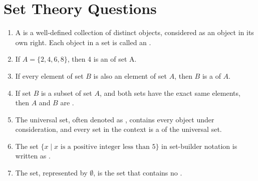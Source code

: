 \documentclass{article}
\begin{document}
\section*{Set Theory Questions}

\begin{enumerate}
    \item A \underline{\hspace{1cm}} is a well-defined collection of distinct objects, considered as an object in its own right. Each object in a set is called an \underline{\hspace{1cm}}.\\[1em]

    \item If \( A = \{ 2, 4, 6, 8 \} \), then 4 is an \underline{\hspace{1cm}} of set A.\\[1em]

    \item If every element of set \( B \) is also an element of set \( A \), then \( B \) is a \underline{\hspace{1cm}} of \( A \).\\[1em]

    \item If set \( B \) is a subset of set \( A \), and both sets have the exact same elements, then \( A \) and \( B \) are \underline{\hspace{1cm}}.\\[1em]

    \item The universal set, often denoted as \underline{\hspace{1cm}}, contains every object under consideration, and every set in the context is a \underline{\hspace{1cm}} of the universal set.\\[1em]

    \item The set \( \{ x \mid x \text{ is a positive integer less than } 5 \} \) in set-builder notation is written as \underline{\hspace{1cm}}.\\[1em]

    \item The \underline{\hspace{1cm}} set, represented by \( \emptyset \), is the set that contains no \underline{\hspace{1cm}}.\\[1em]


\end{enumerate}
\end{document}
